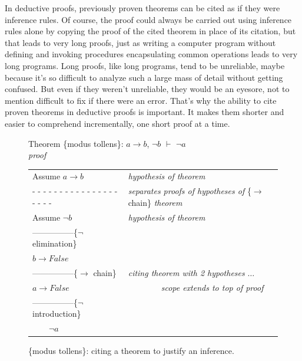 {In deductive proofs, previously proven theorems
can be cited as if they were
inference rules.
Of course, the proof could always be carried out using inference rules alone
by copying the proof of the cited theorem in place of its citation,
but that leads to very long proofs, just as writing a computer program
without defining and invoking procedures encapsulating common operations
leads to very long programs. Long proofs, like long programs, tend
to be unreliable, maybe because it's so difficult
to analyze such a large mass of
detail without getting confused.
But even if they weren't unreliable, they would be an eyesore,
not to mention difficult to fix if there were an error.
That's why the ability to cite proven theorems in
deductive proofs is important. It makes them shorter
and easier to comprehend incrementally, one short proof at a time.

\begin{figure}
Theorem \{modus tollens\}: $a \rightarrow b$, $\neg b$ $\vdash$ $\neg a$\\
\emph{proof}
\begin{center}
\begin{spacing}{0.9}
\begin{tabular}{ll}
Assume $a \rightarrow b$                      &\emph{hypothesis of theorem}\\
 - - - - - - - - - - - - - - - - - - - -      &\emph{separates proofs of hypotheses of} \{$\rightarrow$ chain\} \emph{theorem}\\
Assume $\neg b$                               &\emph{hypothesis of theorem}\\
---------------\{$\neg$ elimination\}         &\\
$b \rightarrow False$                         &\\
---------------\{$\rightarrow$ chain\}        & \emph{citing theorem with 2 hypotheses} $\dots$\\
$a \rightarrow False$                         &~~~~~~~~\emph{scope extends to top of proof}\\
---------------\{$\neg$ introduction\}        &\\
~~~~$\neg a$                                  &\\
\end{tabular}
\end{spacing}
\end{center}
\caption{\{modus tollens\}: citing a theorem to justify an inference.}
\label{fig:modtol-proof}
\end{figure}

}
